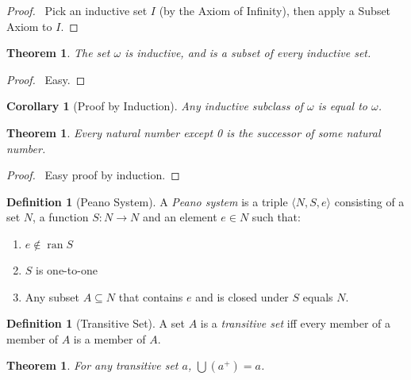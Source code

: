 \documentclass{article}
\let\qed\relax
\newtheorem{theorem}[axiom]{Theorem}
\newtheorem{corollary}{Corollary}[axiom]
\theoremstyle{definition}
\newtheorem{definition}[axiom]{Definition}
\newcommand{\ran}{\ensuremath{\operatorname{ran}}}
\begin{document}
    \begin{proof}
        \pf\ Pick an inductive set $I$ (by the Axiom of Infinity), then apply a Subset Axiom to $I$. \qed
    \end{proof}

    \begin{theorem}
        The set $\omega$ is inductive, and is a subset of every inductive set.
    \end{theorem}

    \begin{proof}
        \pf\ Easy. \qed
    \end{proof}

    \begin{corollary}[Proof by Induction]
        Any inductive subclass of $\omega$ is equal to $\omega$.
    \end{corollary}

    \begin{theorem}
        Every natural number except 0 is the successor of some natural number.
    \end{theorem}

    \begin{proof}
        \pf\ Easy proof by induction. \qed
    \end{proof}

    \begin{definition}[Peano System]
        A \emph{Peano system} is a triple $\langle N, S, e \rangle$ consisting of a set $N$,
        a function $S : N \rightarrow N$ and an element $e \in N$ such that:
        \begin{enumerate}
            \item $e \notin \ran S$
            \item $S$ is one-to-one
            \item Any subset $A \subseteq N$ that contains $e$ and is closed under $S$ equals $N$.
        \end{enumerate}
    \end{definition}

    \begin{definition}[Transitive Set]
        A set $A$ is a \emph{transitive set} iff every member of a member of $A$ is a member of $A$.
    \end{definition}

    \begin{theorem}
        \label{theorem:union_transitive_successor}
        For any transitive set $a$, $\bigcup (a^+) = a$.
    \end{theorem}
\end{document}
